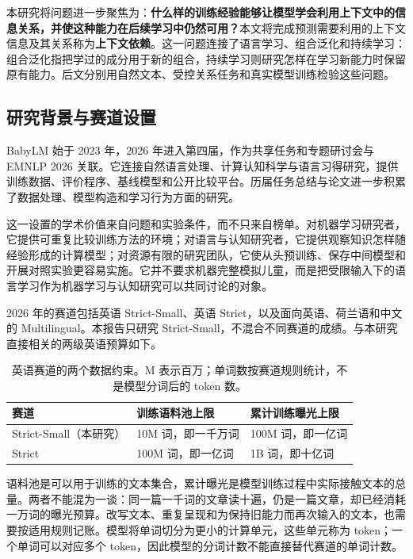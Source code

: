 本研究将问题进一步聚焦为：\textbf{什么样的训练经验能够让模型学会利用上下文中的信息关系，并使这种能力在后续学习中仍然可用？}本文将完成预测需要利用的上下文信息及其关系称为\textbf{上下文依赖}。这一问题连接了语言学习、组合泛化和持续学习：组合泛化指把学过的成分用于新的组合，持续学习则研究怎样在学习新能力时保留原有能力。后文分别用自然文本、受控关系任务和真实模型训练检验这些问题。

\subsection{研究背景与赛道设置}
\label{sec:setting}

BabyLM 始于 2023 年，2026 年进入第四届，作为共享任务和专题研讨会与 EMNLP 2026 关联。它连接自然语言处理、计算认知科学与语言习得研究，提供训练数据、评价程序、基线模型和公开比较平台\citep{warstadt2023babylm,babylm2026website}。历届任务总结与论文进一步积累了数据处理、模型构造和学习行为方面的研究\citep{charpentier2025babylm}。

这一设置的学术价值来自问题和实验条件，而不只来自榜单。对机器学习研究者，它提供可重复比较训练方法的环境；对语言与认知研究者，它提供观察知识怎样随经验形成的计算模型；对资源有限的研究团队，它使从头预训练、保存中间模型和开展对照实验更容易实施。它并不要求机器完整模拟儿童，而是把受限输入下的语言学习作为机器学习与认知研究可以共同讨论的对象。

2026 年的赛道包括英语 Strict-Small、英语 Strict，以及面向英语、荷兰语和中文的 Multilingual。本报告只研究 Strict-Small，不混合不同赛道的成绩。与本研究直接相关的两级英语预算如下\citep{choshen2026babylm}。

\begin{table}[htbp]
\caption{英语赛道的两个数据约束。M 表示百万；单词数按赛道规则统计，不是模型分词后的 token 数。}
\label{tab:tracks}
\begin{tabularx}{\linewidth}{@{}P{45mm}YY@{}}
\toprule 赛道 & 训练语料池上限 & 累计训练曝光上限\\\midrule
Strict-Small（本研究） & 10M 词，即一千万词 & 100M 词，即一亿词\\
Strict & 100M 词，即一亿词 & 1B 词，即十亿词\\
\bottomrule
\end{tabularx}
\end{table}

语料池是可以用于训练的文本集合，累计曝光是模型训练过程中实际接触文本的总量。两者不能混为一谈：同一篇一千词的文章读十遍，仍是一篇文章，却已经消耗一万词的曝光预算。改写文本、重复呈现和为保持旧能力而再次输入的文本，也需要按适用规则记账。模型将单词切分为更小的计算单元，这些单元称为 token；一个单词可以对应多个 token，因此模型的分词计数不能直接替代赛道的单词计数。

